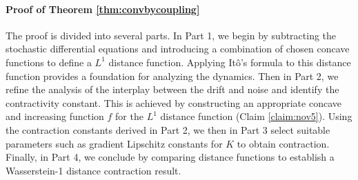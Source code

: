 \documentclass[11pt]{article}
\newcommand{\1}{\mathds{1}}
\begin{document}
\paragraph{Proof of Theorem \ref{thm:convbycoupling} } The proof is divided into several parts. 
In Part 1, we begin by subtracting the stochastic differential equations and introducing a combination of chosen concave functions to define a $L^1$ distance function. Applying It\^{o}'s formula to this distance function provides a foundation for analyzing the dynamics. Then in Part 2, we refine the analysis of the interplay between the drift and noise and identify the contractivity constant. This is achieved by constructing an appropriate concave and increasing function $f$ for the
$L^1$ distance function (Claim \ref{claim:nov5}). Using the contraction constants derived in Part 2,  we then in Part 3 select suitable parameters such as gradient Lipschitz constants for $K$ to obtain contraction. Finally, in Part 4, we conclude by comparing distance functions to establish a Wasserstein-1 distance contraction result.
\end{document}

